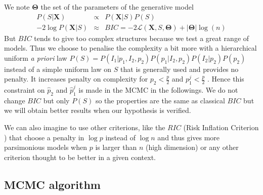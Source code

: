\documentclass[11pt,a4paper]{article}
\begin{document}
	We note $\boldsymbol{\Theta}$ the set of the parameters of the generative model
	\begin{eqnarray}
		P(S|\boldsymbol{X})&\propto& P(\boldsymbol{X}|S)P(S) \label{approxBIC}\\
		-2\log P(\boldsymbol{X}|S)&\approx & BIC=-2\mathcal{L}(\boldsymbol{X},S,\boldsymbol{\Theta})+|\boldsymbol{\Theta}|\log(n)  
	\end{eqnarray}
	But $BIC$ tends to give too complex structures because we test a great range of models. 
	Thus we choose to penalise the complexity a bit more with a hierarchical uniform {\it a priori} law $P(S)=P(I_1 | p_1,I_2,p_2)P(p_1|I_2,p_2)P(I_2|p_2)P(p_2)$  instead of a simple uniform law on $S$ that is generally used and provides no penalty.
	It increases penalty on complexity for $p_2<\frac{p}{2}$ and $p_1^j<\frac{p}{2}$ . Hence %
	this constraint on $\hat{p}_2$ and $\hat{p}_1^j$ is made in the MCMC in the followings.
		We do not change $BIC$ but only $P(S)$ so the properties are the same as classical $BIC$ but we will obtain better results when our hypothesis is verified.

	We can also imagine to use other criterions, like the $RIC$ (Risk Inflation Criterion \cite{foster1994risk}) that choose a penalty in $\log p$ instead of $\log n$ and thus gives more parsimonious models when $p$ is larger than $n$ (high dimension) or any other criterion \cite{george1993variable} thought to be better in a given context. 
	
\subsection{MCMC algorithm}
\end{document}
